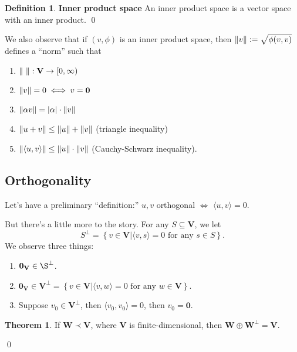 \documentclass{article}
\theoremstyle{definition}
\newtheorem{defn}{Definition}[section]
\newtheorem{thm}{Theorem}[section]
\newcommand{\V}{\mathbf{V}}
\newcommand{\W}{\mathbf{W}}
\newcommand{\la}{\langle}
\newcommand{\ra}{\rangle}
\begin{document}
\begin{defn}\textbf{Inner product space} An inner product space is a vector space with an inner product. 
	\qed
\end{defn}



We also observe that if $(v,\phi)$ is an inner product space, then $\norm{v} := \sqrt{\phi(v,v)}$ defines a ``norm'' such that
\begin{enumerate}
	\item $\norm{\,\,} : \V \to [0,\infty)$\\
	\item $\norm{v} = 0 \iff v = \mathbf{0}$\\
	\item $\norm{\alpha v} = \abs{\alpha}\cdot \norm{v}$\\
	\item $\norm{u + v} \leq \norm{u} + \norm{v}$ (triangle inequality)\\
	\item $\norm{\la u,v \ra} \leq \norm{u}\cdot \norm{v}$ (Cauchy-Schwarz inequality).
\end{enumerate}














\subsection{Orthogonality}

Let's have a preliminary ``definition:'' $u,v$ orthogonal $\iff$ $\la u,v\ra = 0$.

But there's a little more to the story. For any $S \subseteq \V$, we let $$S^\perp = \left\{ v\in \V \big\vert \la v,s \ra = 0 \text{ for any } s \in S \right\}.$$
We observe three things:
\begin{enumerate}
	\item $\mathbf{0}_\V \in \S^\perp$.
	\item $\mathbf{0}_\V \in \V^\perp = \left\{ v\in \V \big\vert \la v,w\ra =0 \text{ for any } w\in \V \right\}$.
	\item Suppose $v_0 \in \V^\perp$, then $\la v_0,v_0\ra = 0$, then $v_0 = \mathbf{0}$. 
\end{enumerate}

\begin{thm}
	If $\W \prec \V$, where $\V$ is finite-dimensional, then $\W \oplus \W^\perp = \V$.
\end{thm}\qed
\end{document}
